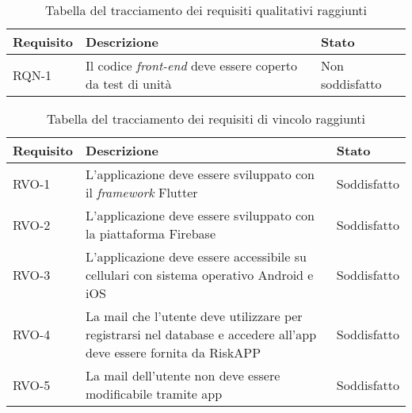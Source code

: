 

\begin{table}[htb]%
\caption{Tabella del tracciamento dei requisiti qualitativi raggiunti}
\label{tab:reqqualitativi-raggiunti}
\begin{tabularx}{\textwidth}{lXl}
\hline
\textbf{Requisito} & \textbf{Descrizione} & \textbf{Stato}\\
\hline\hline
RQN-1    & Il codice \emph{front-end} deve essere coperto da test di unità & Non soddisfatto \\
\hline
\end{tabularx}
\end{table}%


\begin{table}[htb]%
\caption{Tabella del tracciamento dei requisiti di vincolo raggiunti}
\label{tab:reqvincolo-raggiunti}
\begin{tabularx}{\textwidth}{lXl}
\hline
\textbf{Requisito} & \textbf{Descrizione} & \textbf{Stato}\\
\hline\hline
RVO-1    & L'applicazione deve essere sviluppato con il \emph{framework} Flutter & Soddisfatto \\
\hline
RVO-2    & L'applicazione deve essere sviluppato con la piattaforma Firebase & Soddisfatto \\
\hline
RVO-3    & L'applicazione deve essere accessibile su cellulari con sistema operativo Android e iOS & Soddisfatto \\
\hline
RVO-4    & La mail che l'utente deve utilizzare per registrarsi nel database e accedere all'app deve essere fornita da RiskAPP & Soddisfatto \\
\hline
RVO-5    & La mail dell'utente non deve essere modificabile tramite app & Soddisfatto \\
\hline
\end{tabularx}
\end{table}%



